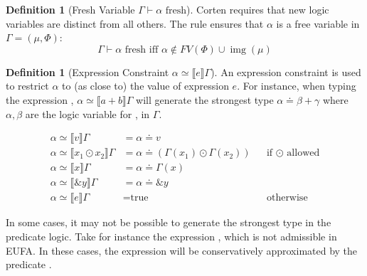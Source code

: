 \documentclass[twoside, english]{sdqthesis}
\newcommand{\bbracket}[1]{\llbracket #1 \rrbracket}
\DeclareMathOperator{\img}{img}
\theoremstyle{definition}
\newtheorem{definition}[theorem]{Definition}
\begin{document}
\begin{definition}[Fresh Variable $\Gamma \vdash \alpha \text{ fresh}$]

Corten requires that new logic variables are distinct from all others. The rule ensures that $\alpha$ is a free variable in $\Gamma = (\mu, \Phi)$:
  $$\Gamma \vdash \alpha \text{ fresh} \text{ iff } \alpha \notin FV(\Phi) \cup \img(\mu)$$
\end{definition}

\begin{definition}[Expression Constraint $\alpha \simeq \bbracket{e}\Gamma$]
An expression constraint is used to restrict $\alpha$ to (as close to) the value of expression $e$. For instance, 
when typing the expression , $\alpha \simeq \bbracket{a + b}\Gamma$ will generate the strongest type $\alpha \doteq \beta + \gamma$ where $\alpha, \beta$ are the logic variable for ,  in $\Gamma$. 

\begin{align*}
  \alpha \simeq \bbracket{v}\Gamma &= \alpha \doteq v
  \\ \alpha \simeq \bbracket{x_1 \odot x_2}\Gamma &= \alpha \doteq (\Gamma(x_1) \odot \Gamma(x_2)) && \text{if }\odot\text{ allowed}
  \\ \alpha \simeq \bbracket{x}\Gamma &= \alpha \doteq \Gamma(x)
  \\ \alpha \simeq \bbracket{\&y}\Gamma &= \alpha \doteq \&y
  \\ \alpha \simeq \bbracket{e}\Gamma &= \text{true} && \text{otherwise}
\end{align*}

In some cases, it may not be possible to generate the strongest type in the predicate logic. Take for instance the expression , which is not admissible in EUFA. In these cases, the expression will be conservatively approximated by the predicate .

\end{definition}
\end{document}
